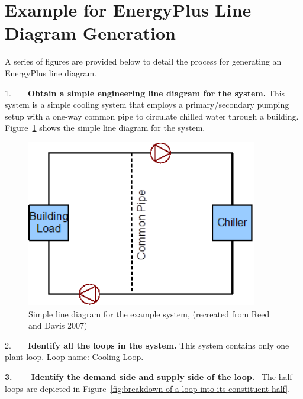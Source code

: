 \section{Example for EnergyPlus Line Diagram Generation}\label{example-for-energyplus-line-diagram-generation}

A series of figures are provided below to detail the process for generating an EnergyPlus line diagram.

1.~~~~\textbf{Obtain a simple engineering line diagram for the system.} This system is a simple cooling system that employs a primary/secondary pumping setup with a one-way common pipe to circulate chilled water through a building. Figure~\ref{fig:simple-line-diagram-for-the-example-system} shows the simple line diagram for the system.

\begin{figure}[hbtp] %
\centering
\includegraphics[width=0.9\textwidth, height=0.9\textheight, keepaspectratio=true]{media/image003.png}
\caption{Simple line diagram for the example system, (recreated from Reed and Davis 2007) \protect \label{fig:simple-line-diagram-for-the-example-system}}
\end{figure}

2.~~~~\textbf{Identify all the loops in the system.} This system contains only one plant loop. Loop name: Cooling Loop.

\textbf{3.~~~~Identify the demand side and supply side of the loop.} ~The half loops are depicted in Figure~\ref{fig:breakdown-of-a-loop-into-its-constituent-half}.

